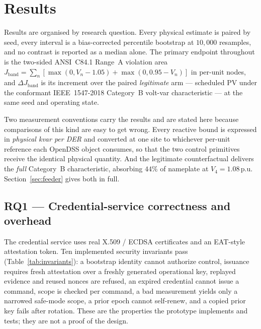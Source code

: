 \section{Results}\label{sec:results}

Results are organised by research question. Every physical estimate is paired by seed, every
interval is a bias-corrected percentile bootstrap at $10{,}000$ resamples, and no contrast is
reported as a median alone. The primary endpoint throughout is the two-sided ANSI~C84.1 Range~A
violation area $J_{\mathrm{band}} = \sum_n [\max(0, V_n - 1.05) + \max(0, 0.95 - V_n)]$ in
per-unit nodes, and $\Delta J_{\mathrm{band}}$ is its increment over the paired \emph{legitimate}
arm --- scheduled PV under the conformant IEEE~1547-2018 Category~B volt-var characteristic --- at
the same seed and operating state.

Two measurement conventions carry the results and are stated here because comparisons of this
kind are easy to get wrong. Every reactive bound is expressed in \emph{physical kvar per DER} and
converted at one site to whichever per-unit reference each OpenDSS object consumes, so that the
two control primitives receive the identical physical quantity. And the legitimate counterfactual
delivers the \emph{full} Category~B characteristic, absorbing $44\%$ of nameplate at
$V_4 = 1.08$\,p.u. Section~\ref{sec:feeder} gives both in full.

\subsection{RQ1 --- Credential-service correctness and overhead}
The credential service uses real X.509 / ECDSA certificates and an EAT-style attestation token.
Ten implemented security invariants pass (Table~\ref{tab:invariants}): a bootstrap identity cannot
authorize control, issuance requires fresh attestation over a freshly generated operational key,
replayed evidence and reused nonces are refused, an expired credential cannot issue a command,
scope is checked per command, a bad measurement yields only a narrowed safe-mode scope, a prior
epoch cannot self-renew, and a copied prior key fails after rotation. These are the properties the
prototype implements and tests; they are not a proof of the design.

